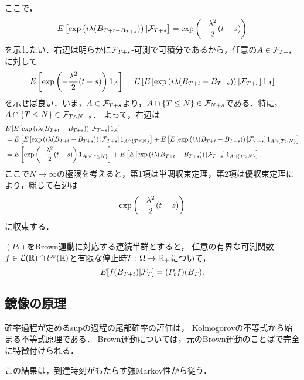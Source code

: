 \documentclass[uplatex,dvipdfmx]{jsreport}
\begin{document}
\begin{Proof}
\begin{description}
        ここで，
        \[E\left[\exp\left(i\lambda(B_{T+t-B_{T+s}})\right)|\mathcal{F}_{T+s}\right]=\exp\left(-\frac{\lambda^2}{2}(t-s)\right)\]
        を示したい．右辺は明らかに$\mathcal{F}_{T+s}$-可測で可積分であるから，任意の$A\in\mathcal{F}_{T+s}$に対して
        \[E\left[\exp\left(-\frac{\lambda^2}{2}(t-s)\right)1_A\right]=E\left[E\left[\exp\left(i\lambda(B_{T+t}-B_{T+s})\right)|\mathcal{F}_{T+s}\right]1_{A}\right]\]
        を示せば良い．いま，$A\in\mathcal{F}_{T+s}$より，$A\cap\left\{T\le N\right\}\in\mathcal{F}_{N+s}$である．特に，$A\cap\left\{T\le N\right\}\in\mathcal{F}_{T\land N+s}$．
        よって，右辺は
        \begin{align*}
            &E\left[E\left[\exp\left(i\lambda(B_{T+t}-B_{T+s})\right)|\mathcal{F}_{T+s}\right]1_{A}\right]\\
            &=E\left[E\left[\exp\left(i\lambda(B_{T+t}-B_{T+s})\right)|\mathcal{F}_{T+s}\right]1_{A\cap\left\{T\le N\right\}}\right]+E\left[E\left[\exp\left(i\lambda(B_{T+t}-B_{T+s})\right)|\mathcal{F}_{T+s}\right]1_{A\cap\left\{T>N\right\}}\right]\\
            &=E\left[\exp\left(-\frac{\lambda^2}{2}(t-s)\right)1_{A\cap\left\{T\le N\right\}}\right]+E\left[E\left[\exp\left(i\lambda(B_{T+t}-B_{T+s})\right)|\mathcal{F}_{T+s}\right]1_{A\cap\left\{T>N\right\}}\right].
        \end{align*}
        ここで$N\to\infty$の極限を考えると，第1項は単調収束定理，第2項は優収束定理により，総じて右辺は
        \[\exp\left(-\frac{\lambda^2}{2}(t-s)\right)\]
        に収束する．
    \end{description}
\end{Proof}

\begin{corollary}[時間一様性]
    $(P_t)$をBrown運動に対応する連続半群とすると，
    任意の有界な可測関数$f\in\mathcal{L}(\mathbb{R})\cap l^\infty(\mathbb{R})$と有限な停止時$T:\Omega\to\mathbb{R}_+$について，
    \[E[f(B_{T+t})|\mathcal{F}_T]=(P_tf)(B_T).\]
\end{corollary}

\subsection{鏡像の原理}

\begin{tcolorbox}[colframe=ForestGreen, colback=ForestGreen!10!white,breakable,colbacktitle=ForestGreen!40!white,coltitle=black,fonttitle=\bfseries\sffamily,
title=]
    確率過程が定めるsupの過程の尾部確率の評価は，
    Kolmogorovの不等式から始まる不等式原理である．
    Brown運動については，元のBrown運動のことばで完全に特徴付けられる．

    この結果は，到達時刻がもたらす強Markov性から従う．
\end{tcolorbox}
\end{document}
